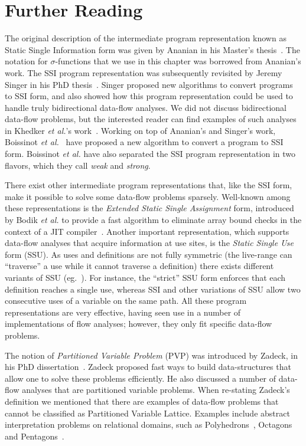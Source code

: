 \section{Further Reading}

The original description of the intermediate program representation known as Static Single Information form was given by Ananian in his Master's thesis~\cite{Ananian99}.
The notation for $\sigma$-functions that we use in this chapter was borrowed from Ananian's work.
The SSI program representation was subsequently revisited by Jeremy Singer in his PhD thesis~\cite{Singer06}.
Singer proposed new algorithms to convert programs to SSI form, and also showed how this program representation could be used to handle truly bidirectional data-flow analyses.
We did not discuss bidirectional data-flow problems, but the interested reader can find examples of such analyses in Khedker {\em et al.}'s work~\cite{Khedker99}.
Working on top of Ananian's and Singer's work, Boissinot {\em et al.}~\cite{Benoit09} have proposed a new algorithm to convert a program to SSI form.
Boissinot {\em et al.} have also separated the SSI program representation in two flavors, which they call {\em weak} and {\em strong}.

There exist other intermediate program representations that, like the SSI form, make it possible to solve some data-flow problems sparsely.
Well-known among these representations is the {\em Extended Static Single Assignment} form, introduced by Bodik {\em et al.} to provide a fast algorithm to eliminate array bound checks in the context of a JIT compiler~\cite{Bodik00}.
Another important representation, which supports data-flow analyses that acquire information at use sites, is the \emph{Static Single Use} form (SSU).
As uses and definitions are not fully symmetric (the live-range can ``traverse'' a use while it cannot traverse a definition) there exists different variants of SSU (eg.~\cite{Plevyak96,George03-IXP,Lo98_registerPromotion}).
For instance, the ``strict'' SSU form enforces that each definition reaches a
single use, whereas SSI and other variations of SSU allow two consecutive uses
of a variable on the same path.
All these program representations are very effective, having seen use in a number of implementations of flow analyses; however, they only fit specific data-flow problems.

The notion of {\em Partitioned Variable Problem} (PVP) was introduced by Zadeck, in his PhD dissertation~\cite{Zadeck84}.
Zadeck proposed fast ways to build data-structures that allow one to solve these problems efficiently.
He also discussed a number of data-flow analyses that are partitioned variable problems.
When re-stating Zadeck's definition we mentioned that there are examples of data-flow problems that cannot be classified as Partitioned Variable Lattice.
Examples include abstract interpretation problems on relational domains, such as Polyhedrons~\cite{Cousot78}, Octagons~\cite{Mine06} and Pentagons~\cite{Logozzo08}.

